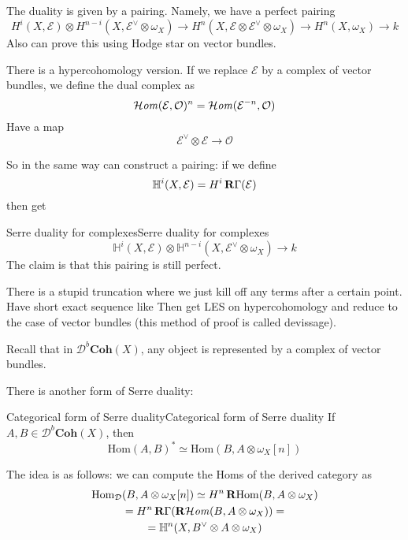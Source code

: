 The duality is given by a pairing. Namely, we have a perfect pairing$$H^i(X,\mathcal{E})\otimes H^{n-i}(X,\mathcal{E}^\lor\otimes \omega_{X})\xrightarrow{}H^n(X, \mathcal{E}\otimes \mathcal{E}^\lor\otimes \omega_{X})\xrightarrow{}H^n(X, \omega_{X})\xrightarrow{}k$$
Also can prove this using Hodge star on vector bundles.

There is a hypercohomology version. If we replace $\mathcal{E}$ by a complex of vector bundles, we define the dual complex as $$\operatorname{\mathcal{H}\mathit{om}}(\mathcal{E},\mathcal{O})^n=\operatorname{\mathcal{H}\mathit{om}}(\mathcal{E}^{-n}, \mathcal{O})$$Have a map $$\mathcal{E}^\lor \otimes \mathcal{E}\xrightarrow{}\mathcal{O}$$


So in the same way can construct a pairing: if we define $$\mathbb{H}^i(X,\mathcal{E})=H^i\operatorname{\mathbf{R}\Gamma}(\mathcal{E)}$$ then get 

\begin{proposition}{Serre duality for complexes}{Serre duality for complexes}
        $$\mathbb{H}^i(X,\mathcal{E})\otimes \mathbb{H}^{n-i}(X, \mathcal{E}^\lor \otimes \omega_{X})\xrightarrow{}k$$
The claim is that this pairing is still perfect.
\end{proposition}

There is a stupid truncation where we just kill off any terms after a certain point. Have short exact sequence like %
Then get LES on hypercohomology and reduce to the case of vector bundles (this method of proof is called devissage).

Recall that in $\mathcal{D}^b\mathbf{Coh}(X)$, any object is represented by a complex of vector bundles. 

There is another form of Serre duality:

\begin{proposition}{Categorical form of Serre duality}{Categorical form of Serre duality}
    If $A,B\in \mathcal{D}^b\mathbf{Coh}(X)$, then $$\mathrm{Hom}(A,B)^*\simeq \mathrm{Hom}(B,A\otimes \omega_{X}[n])$$
\end{proposition}

The idea is as follows: we can compute the Homs of the derived category as 
$$\begin{gathered}
    \mathrm{Hom}_{\mathcal{D}}(B,A\otimes \omega_{X}[n])\simeq H^n\operatorname{\mathbf{R}Hom}(B,A\otimes \omega_{X})\\=H^n \operatorname{\mathbf{R}\Gamma} ( \operatorname{\mathbf{R}\mathcal{H}\mathit{om}}(B,A\otimes \omega_{X}))=\\=\mathbb{H}^n(X,B^\lor \otimes A \otimes \omega_{X})
\end{gathered}$$

